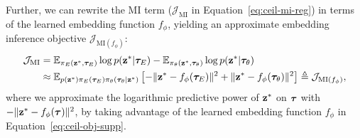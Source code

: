 Further, we can rewrite the MI term ($\mathcal{J}_\text{MI}$ in Equation~\ref{eq:ceil-mi-reg}) in terms of the learned embedding function $f_\phi$, yielding an approximate embedding inference objective $\mathcal{J}_{\text{MI}(f_\phi)}$: %
\begin{align}
	\mathcal{J}_\text{MI} 
	&= \mathbb{E}_{\pi_E({\mathbf{z}}^*, {\bm{\tau}}_E)}\log p({\mathbf{z}}^*|{\bm{\tau}}_E) - \mathbb{E}_{\pi_\theta({\mathbf{z}}^*, {\bm{\tau}}_\theta)}\log p({\mathbf{z}}^*|{\bm{\tau}}_\theta)  \nonumber \\
	&\approx \mathbb{E}_{p({\mathbf{z}}^*)\pi_E({\bm{\tau}}_E)\pi_\theta({\bm{\tau}}_\theta|{\mathbf{z}}^*)} \left[ - \Vert{\mathbf{z}}^*-f_\phi({\bm{\tau}}_E)\Vert^2 + \Vert{\mathbf{z}}^*-f_\phi({\bm{\tau}}_\theta)\Vert^2 \right] \nonumber \triangleq \mathcal{J}_{\text{MI}(f_\phi)}, 
\end{align} %
where we approximate the logarithmic predictive power of ${\mathbf{z}}^*$ on ${\bm{\tau}}$ with $- \Vert{\mathbf{z}}^*-f_\phi({\bm{\tau}})\Vert^2$, by taking advantage of the learned embedding function $f_\phi$ in Equation~\ref{eq:ceil-obj-supp}. 




